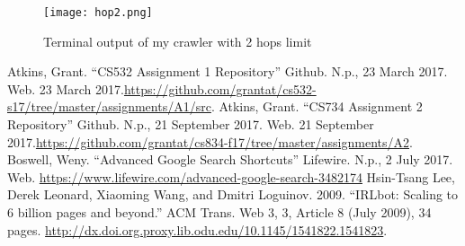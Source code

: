 \documentclass[letterpaper,11pt]{article}
\begin{document}
\begin{figure}[h]
\centering
\texttt{[image: hop2.png]}
\caption{Terminal output of my crawler with 2 hops limit}
\label{fig:hop2}
\end{figure}


\clearpage



\begin{thebibliography}{9}
Atkins, Grant. ``CS532 Assignment 1 Repository'' Github. N.p., 23 March 2017. Web. 23 March 2017.\url{https://github.com/grantat/cs532-s17/tree/master/assignments/A1/src}.
Atkins, Grant. ``CS734 Assignment 2 Repository'' Github. N.p., 21 September 2017. Web. 21 September 2017.\url{https://github.com/grantat/cs834-f17/tree/master/assignments/A2}.
Boswell, Weny. ``Advanced Google Search Shortcuts'' Lifewire. N.p., 2 July 2017. Web. \url{https://www.lifewire.com/advanced-google-search-3482174}
Hsin-Tsang Lee, Derek Leonard, Xiaoming Wang, and Dmitri Loguinov. 2009. ``IRLbot: Scaling to 6 billion pages and beyond.'' ACM Trans. Web 3, 3, Article 8 (July 2009), 34 pages. \url{http://dx.doi.org.proxy.lib.odu.edu/10.1145/1541822.1541823}.
\end{thebibliography}
\end{document}

